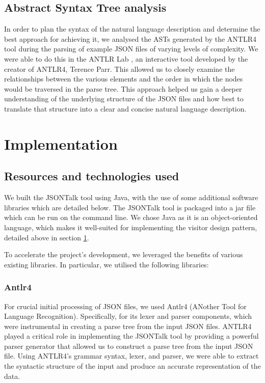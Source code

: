 \documentclass{l4proj}
\begin{document}
 \section{Abstract Syntax Tree analysis}
 \label{section:visitor}
 
In order to plan the syntax of the natural language description and determine the best approach for achieving it, we analysed the ASTs generated by the ANTLR4 tool during the parsing of example JSON files of varying levels of complexity. We were able to do this in the ANTLR Lab \cite{antlrLab}, an interactive tool developed by the creator of ANTLR4, Terence Parr. This allowed us to closely examine the relationships between the various elements and the order in which the nodes would be traversed in the parse tree. This approach helped us gain a deeper understanding of the underlying structure of the JSON files and how best to translate that structure into a clear and concise natural language description.

	

\chapter{Implementation}

\section{Resources and technologies used}

We built the JSONTalk tool using Java, with the use of some additional software libraries which are detailed below. The JSONTalk tool is packaged into a jar file which can be run on the command line. We chose Java as it is an object-oriented language, which makes it well-suited for implementing the visitor design pattern, detailed above in section \ref{section:visitor}.

To accelerate the project's development, we leveraged the benefits of various existing libraries. In particular, we utilised the following libraries:

\subsection{Antlr4}

 For crucial initial processing of JSON files, we used Antlr4 (ANother Tool for Language Recognition)\cite{antlr4}. Specifically, for its lexer and parser components, which were instrumental in creating a parse tree from the input JSON files. ANTLR4 played a critical role in implementing the JSONTalk tool by providing a powerful parser generator that allowed us to construct a parse tree from the input JSON file. Using ANTLR4's grammar syntax, lexer, and parser, we were able to extract the syntactic structure of the input and produce an accurate representation of the data.
 
\end{document}
